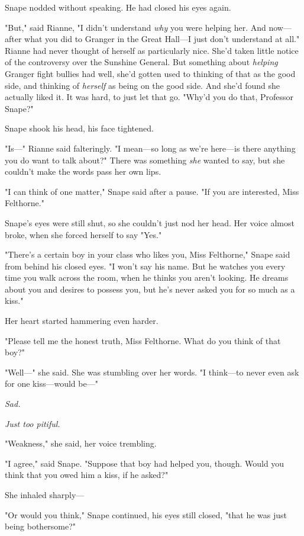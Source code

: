 Snape nodded without speaking. He had closed his eyes again.

"But," said Rianne, "I didn't understand \emph{why} you were helping her. And
now---after what you did to Granger in the Great Hall---I just don't understand
at all." Rianne had never thought of herself as particularly nice. She'd taken
little notice of the controversy over the Sunshine General. But something about
\emph{helping} Granger fight bullies had{\el} well, she'd gotten used to
thinking of that as the good side, and thinking of \emph{herself} as being on
the good side. And she'd found she actually liked it. It was hard, to just let
that go. "Why'd you do that, Professor Snape?"

Snape shook his head, his face tightened.

"Is\mbox{---}" Rianne said falteringly. "I mean---so long as we're here---is there
anything you do want to talk about?" There was something \emph{she} wanted to
say, but she couldn't make the words pass her own lips.

"I can think of one matter," Snape said after a pause. "If you are interested,
Miss Felthorne."

Snape's eyes were still shut, so she couldn't just nod her head. Her voice
almost broke, when she forced herself to say "Yes."

"There's a certain boy in your class who likes you, Miss Felthorne," Snape said
from behind his closed eyes. "I won't say his name. But he watches you every
time you walk across the room, when he thinks you aren't looking. He dreams
about you and desires to possess you, but he's never asked you for so much as a
kiss."

Her heart started hammering even harder.

"Please tell me the honest truth, Miss Felthorne. What do you think of that
boy?"

"Well\mbox{---}" she said. She was stumbling over her words. "I think---to never even
ask for one kiss---would be\mbox{---}"

\emph{Sad.}

\emph{Just too pitiful.}

"Weakness," she said, her voice trembling.

"I agree," said Snape. "Suppose that boy had helped you, though. Would you
think that you owed him a kiss, if he asked?"

She inhaled sharply---

"Or would you think," Snape continued, his eyes still closed, "that he was just
being bothersome?"


